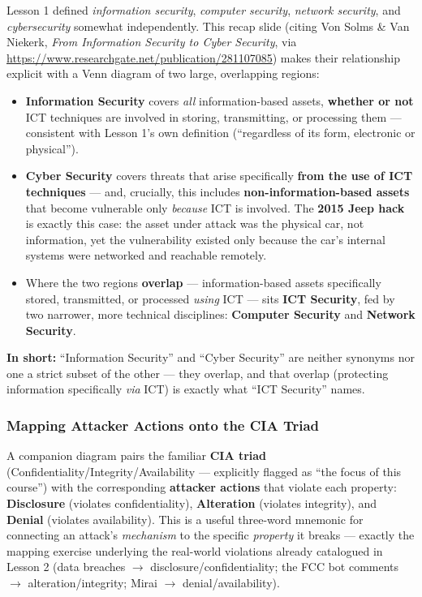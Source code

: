 \documentclass[12pt, a4paper]{article}
\begin{document}
Lesson 1 defined \emph{information security}, \emph{computer security}, \emph{network security}, and \emph{cybersecurity} somewhat independently. This recap slide (citing Von Solms \& Van Niekerk, \emph{From Information Security to Cyber Security}, via \url{https://www.researchgate.net/publication/281107085}) makes their relationship explicit with a Venn diagram of two large, overlapping regions:
\begin{itemize}
    \item \textbf{Information Security} covers \emph{all} information-based assets, \textbf{whether or not} ICT techniques are involved in storing, transmitting, or processing them --- consistent with Lesson 1's own definition (``regardless of its form, electronic or physical'').
    \item \textbf{Cyber Security} covers threats that arise specifically \textbf{from the use of ICT techniques} --- and, crucially, this includes \textbf{non-information-based assets} that become vulnerable only \emph{because} ICT is involved. The \textbf{2015 Jeep hack} is exactly this case: the asset under attack was the physical car, not information, yet the vulnerability existed only because the car's internal systems were networked and reachable remotely.
    \item Where the two regions \textbf{overlap} --- information-based assets specifically stored, transmitted, or processed \emph{using} ICT --- sits \textbf{ICT Security}, fed by two narrower, more technical disciplines: \textbf{Computer Security} and \textbf{Network Security}.
\end{itemize}
\textcolor{blue!50!black}{\textbf{In short:}} ``Information Security'' and ``Cyber Security'' are neither synonyms nor one a strict subset of the other --- they overlap, and that overlap (protecting information specifically \emph{via} ICT) is exactly what ``ICT Security'' names.

\subsubsection{Mapping Attacker Actions onto the CIA Triad}
A companion diagram pairs the familiar \textbf{CIA triad} (Confidentiality/Integrity/Availability --- explicitly flagged as ``the focus of this course'') with the corresponding \textbf{attacker actions} that violate each property: \textbf{Disclosure} (violates confidentiality), \textbf{Alteration} (violates integrity), and \textbf{Denial} (violates availability). This is a useful three-word mnemonic for connecting an attack's \emph{mechanism} to the specific \emph{property} it breaks --- exactly the mapping exercise underlying the real-world violations already catalogued in Lesson 2 (data breaches $\to$ disclosure/confidentiality; the FCC bot comments $\to$ alteration/integrity; Mirai $\to$ denial/availability).
\end{document}
